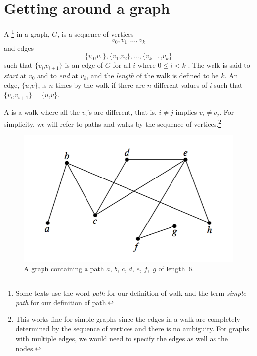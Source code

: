 \documentclass[12pt]{article}
\newcommand{\edge}[2]{\{#1\text{,}#2\}}
\begin{document}


\section{Getting around a graph}

\begin{definition}\label{def:undirected-path}
A \footnote{Some texts use the word \emph{path} for our
  definition of walk and the term \emph{simple path} for our
  definition of path.} in a graph, $G$, is a sequence of vertices
\begin{equation*}
v_0, v_1, \dots, v_k
\end{equation*}
and edges
\begin{equation*}
    \edge{v_0}{v_1}, \edge{v_1}{v_2}, \dots, \edge{v_{k - 1}}{v_k}
\end{equation*} 
such that $\edge{v_i}{v_{i+1}}$ is an edge of $G$ for all $i$ where $0
\leq i < k$ .  The walk is said to \emph{start}
at $v_0$ and to \emph{end} at $v_k$, and the
\emph{length} of the walk is defined to be $k$.
An edge, $\edge{u}{v}$, is  $n$ times by the walk if
there are $n$ different values of $i$ such that $\edge{v_i}{v_{i+1}} =
\edge{u}{v}$.  
\end{definition}
\begin{definition}
A  is a walk where all the $v_i$'s are
different, that is, $i\neq j$ implies $v_i \neq v_j$.  For simplicity,
we will refer to paths and walks by the sequence of
vertices.\footnote{This works fine for simple graphs since the edges
  in a walk are completely determined by the sequence of vertices and
  there is no ambiguity.  For graphs with multiple edges, we would
  need to specify the edges as well as the nodes.}
\end{definition}

\begin{figure}[!h]

\includegraphics{distance-graph}
\centering
\caption{A graph containing a path $a$, $b$, $c$, $d$, $e$, $f$,~$g$
  of length~6.}
\label{dg}
\end{figure}
\end{document}
